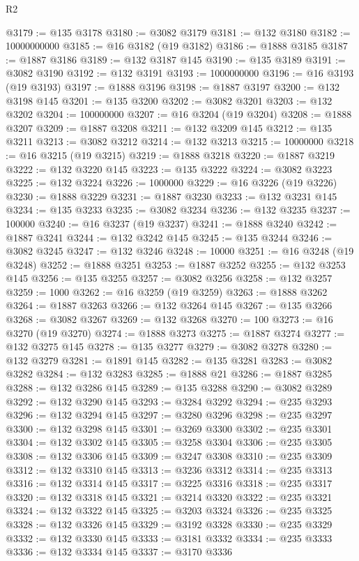\begin{lexlean}{R2}
\begin{coremodule}
@3179 := @135 @3178
@3180 := @3082 @3179
@3181 := @132 @3180
@3182 := 10000000000
@3185 := @16 @3182 (@19 @3182)
@3186 := @1888 @3185
@3187 := @1887 @3186
@3189 := @132 @3187 @145
@3190 := @135 @3189
@3191 := @3082 @3190
@3192 := @132 @3191
@3193 := 1000000000
@3196 := @16 @3193 (@19 @3193)
@3197 := @1888 @3196
@3198 := @1887 @3197
@3200 := @132 @3198 @145
@3201 := @135 @3200
@3202 := @3082 @3201
@3203 := @132 @3202
@3204 := 100000000
@3207 := @16 @3204 (@19 @3204)
@3208 := @1888 @3207
@3209 := @1887 @3208
@3211 := @132 @3209 @145
@3212 := @135 @3211
@3213 := @3082 @3212
@3214 := @132 @3213
@3215 := 10000000
@3218 := @16 @3215 (@19 @3215)
@3219 := @1888 @3218
@3220 := @1887 @3219
@3222 := @132 @3220 @145
@3223 := @135 @3222
@3224 := @3082 @3223
@3225 := @132 @3224
@3226 := 1000000
@3229 := @16 @3226 (@19 @3226)
@3230 := @1888 @3229
@3231 := @1887 @3230
@3233 := @132 @3231 @145
@3234 := @135 @3233
@3235 := @3082 @3234
@3236 := @132 @3235
@3237 := 100000
@3240 := @16 @3237 (@19 @3237)
@3241 := @1888 @3240
@3242 := @1887 @3241
@3244 := @132 @3242 @145
@3245 := @135 @3244
@3246 := @3082 @3245
@3247 := @132 @3246
@3248 := 10000
@3251 := @16 @3248 (@19 @3248)
@3252 := @1888 @3251
@3253 := @1887 @3252
@3255 := @132 @3253 @145
@3256 := @135 @3255
@3257 := @3082 @3256
@3258 := @132 @3257
@3259 := 1000
@3262 := @16 @3259 (@19 @3259)
@3263 := @1888 @3262
@3264 := @1887 @3263
@3266 := @132 @3264 @145
@3267 := @135 @3266
@3268 := @3082 @3267
@3269 := @132 @3268
@3270 := 100
@3273 := @16 @3270 (@19 @3270)
@3274 := @1888 @3273
@3275 := @1887 @3274
@3277 := @132 @3275 @145
@3278 := @135 @3277
@3279 := @3082 @3278
@3280 := @132 @3279
@3281 := @1891 @145
@3282 := @135 @3281
@3283 := @3082 @3282
@3284 := @132 @3283
@3285 := @1888 @21
@3286 := @1887 @3285
@3288 := @132 @3286 @145
@3289 := @135 @3288
@3290 := @3082 @3289
@3292 := @132 @3290 @145
@3293 := @3284 @3292
@3294 := @235 @3293
@3296 := @132 @3294 @145
@3297 := @3280 @3296
@3298 := @235 @3297
@3300 := @132 @3298 @145
@3301 := @3269 @3300
@3302 := @235 @3301
@3304 := @132 @3302 @145
@3305 := @3258 @3304
@3306 := @235 @3305
@3308 := @132 @3306 @145
@3309 := @3247 @3308
@3310 := @235 @3309
@3312 := @132 @3310 @145
@3313 := @3236 @3312
@3314 := @235 @3313
@3316 := @132 @3314 @145
@3317 := @3225 @3316
@3318 := @235 @3317
@3320 := @132 @3318 @145
@3321 := @3214 @3320
@3322 := @235 @3321
@3324 := @132 @3322 @145
@3325 := @3203 @3324
@3326 := @235 @3325
@3328 := @132 @3326 @145
@3329 := @3192 @3328
@3330 := @235 @3329
@3332 := @132 @3330 @145
@3333 := @3181 @3332
@3334 := @235 @3333
@3336 := @132 @3334 @145
@3337 := @3170 @3336

\end{coremodule}
\end{lexlean}
